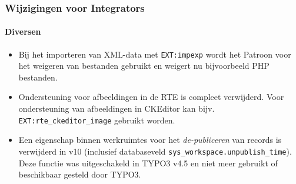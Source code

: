 
\begin{frame}[fragile]
	\frametitle{Wijzigingen voor Integrators}
	\framesubtitle{Diversen}

	\lstset{basicstyle=\tiny\ttfamily}

	\begin{itemize}

		\item Bij het importeren van XML-data met \texttt{EXT:impexp} wordt het Patroon voor het weigeren van bestanden gebruikt en
			weigert nu bijvoorbeeld PHP bestanden.

		\item Ondersteuning voor afbeeldingen in de RTE is compleet verwijderd.
			Voor ondersteuning van afbeeldingen in CKEditor kan bijv. \texttt{EXT:rte\_ckeditor\_image} gebruikt worden.

		\item Een eigenschap binnen werkruimtes voor het \textit{de-publiceren} van records is verwijderd in v10
			(inclusief databaseveld \texttt{sys\_workspace.unpublish\_time}). Deze functie was uitgeschakeld
			in TYPO3 v4.5 en niet meer gebruikt of beschikbaar gesteld door TYPO3.

	\end{itemize}

\end{frame}


